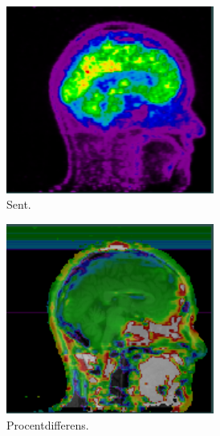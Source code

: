 \begin{figure}[H]
\begin{subfigure}{0.3\textwidth}
        \includegraphics[width=0.75\textwidth]{colager/over_tid_pet/over_tid_140547_late.png}
        \caption{Sent.}
        \label{col:over_time_pet_pat2_late}
    \end{subfigure}\hfill
    \begin{subfigure}{0.3\textwidth}
        \centering
        \includegraphics[width=0.75\textwidth]{colager/over_tid_pet/over_tid_140547_pd.png}
        \caption{Procentdifferens.}
        \label{col:over_time_pet_pat2_pd}
    \end{subfigure}\\
    \begin{subfigure}{0.3\textwidth}
        \centering

\end{subfigure}
\end{figure}
